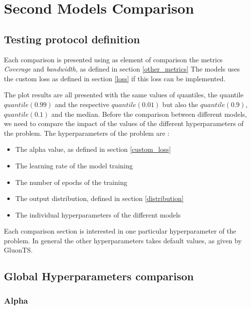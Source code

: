 \section{Second Models Comparison}
\label{part5}

\subsection{Testing protocol definition}


Each comparison is presented using as element of comparison the metrics \textit{Coverage} and \textit{bandwidth}, as defined in section \ref{other_metrics}
The models uses the custom loss as defined in section \ref{loss} if this loss can be implemented.

The plot results are all presented with the same values of quantiles, the quantile $quantile(0.99)$ and the respective $quantile(0.01)$ but also the $quantile(0.9)$, $quantile(0.1)$ and the median.
Before the comparison between different models, we need to compare the impact of the values of the different hyperparameters of the problem.
The hyperparameters of the problem are :
\begin{itemize}
\item The alpha value, as defined in section \ref{custom_loss}
    \item The learning rate of the model training
    \item The number of epochs of the training
    \item The output distribution, defined in section \ref{distribution}
    \item The individual hyperparameters of the different models
\end{itemize}
Each comparison section is interested in one particular hyperparameter of the problem.
In general the other hyperparameters takes default values, as given by GluonTS.

\subsection{Global Hyperparameters comparison}

\subsubsection{Alpha} \label{comp2_alpha}

